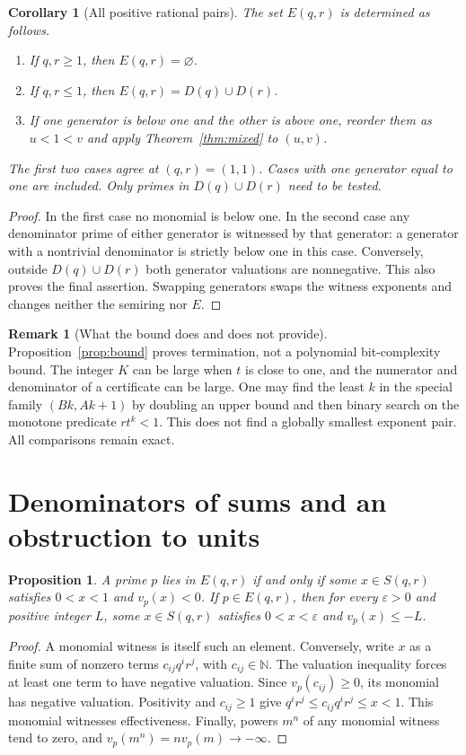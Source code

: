 \documentclass[11pt]{article}
\newtheorem{proposition}[theorem]{Proposition}
\newtheorem{corollary}[theorem]{Corollary}
\theoremstyle{definition}
\newtheorem{remark}[theorem]{Remark}
\newcommand{\NN}{\mathbb N}
\begin{document}
\begin{corollary}[All positive rational pairs]\label{cor:all}
The set $E(q,r)$ is determined as follows.
\begin{enumerate}
\item If $q,r\ge1$, then $E(q,r)=\varnothing$.
\item If $q,r\le1$, then $E(q,r)=D(q)\cup D(r)$.
\item If one generator is below one and the other is above one, reorder
them as $u<1<v$ and apply Theorem~\ref{thm:mixed} to $(u,v)$.
\end{enumerate}
The first two cases agree at $(q,r)=(1,1)$. Cases with one generator equal
to one are included. Only primes in $D(q)\cup D(r)$ need to be tested.
\end{corollary}
\begin{proof}
In the first case no monomial is below one. In the second case any
denominator prime of either generator is witnessed by that generator:
a generator with a nontrivial denominator is strictly below one in this
case. Conversely, outside $D(q)\cup D(r)$ both generator valuations are
nonnegative. This also proves the final assertion. Swapping generators
swaps the witness exponents and changes neither the semiring nor $E$.
\end{proof}

\begin{remark}[What the bound does and does not provide]
Proposition~\ref{prop:bound} proves termination, not a polynomial bit-complexity
bound. The integer $K$ can be large when $t$ is close to one, and the
numerator and denominator of a certificate can be large. One may find the
least $k$ in the special family $(Bk,Ak+1)$ by doubling an upper bound and
then binary search on the monotone predicate $rt^k<1$. This does not find
a globally smallest exponent pair. All comparisons remain exact.
\end{remark}

\section{Denominators of sums and an obstruction to units}
\begin{proposition}\label{prop:sums}
A prime $p$ lies in $E(q,r)$ if and only if some $x\in S(q,r)$ satisfies
$0<x<1$ and $v_p(x)<0$. If $p\in E(q,r)$, then for every $\varepsilon>0$
and positive integer $L$, some $x\in S(q,r)$ satisfies
$0<x<\varepsilon$ and $v_p(x)\le-L$.
\end{proposition}
\begin{proof}
A monomial witness is itself such an element. Conversely, write $x$ as a
finite sum of nonzero terms $c_{ij}q^ir^j$, with $c_{ij}\in\NN$.
The valuation inequality forces at least one term to have negative
valuation. Since $v_p(c_{ij})\ge0$, its monomial has negative valuation.
Positivity and $c_{ij}\ge1$ give $q^ir^j\le c_{ij}q^ir^j\le x<1$.
This monomial witnesses effectiveness. Finally, powers $m^n$ of any
monomial witness tend to zero, and $v_p(m^n)=nv_p(m)\to-\infty$.
\end{proof}
\end{document}
